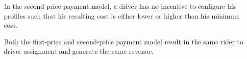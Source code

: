 \begin{theorem}
In the second-price payment model, a driver has no incentive to configure his profiles such that his resulting cost is either lower or higher than his minimum cost.
\end{theorem}

\begin{theorem}
Both the first-price and second-price payment model result in the same rider to driver assignment and generate the same revenue.
\end{theorem}